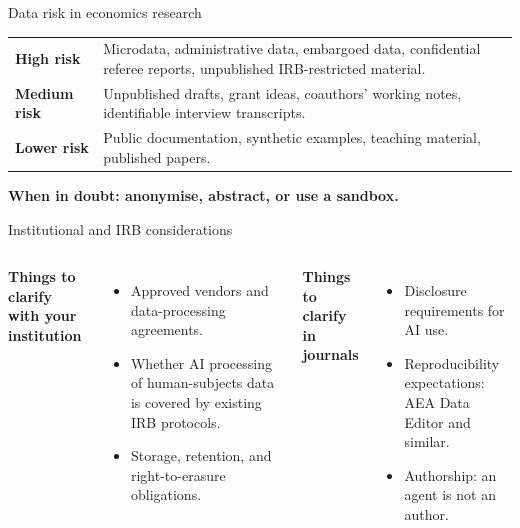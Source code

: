 \begin{frame}{Data risk in economics research}
  \vspace{0.2cm}
  \begin{center}
  \begin{tabularx}{0.92\linewidth}{>{\bfseries\color{deepblue}}lX}
  \toprule
  High risk & Microdata, administrative data, embargoed data, confidential referee reports, unpublished IRB-restricted material.\\
  Medium risk & Unpublished drafts, grant ideas, coauthors' working notes, identifiable interview transcripts.\\
  Lower risk & Public documentation, synthetic examples, teaching material, published papers.\\
  \bottomrule
  \end{tabularx}
  \end{center}
  \vspace{0.4cm}
  \begin{center}\Large\color{accent}\bfseries When in doubt: anonymise, abstract, or use a sandbox.\end{center}
  
\end{frame}

\begin{frame}{Institutional and IRB considerations}
  \begin{columns}[T,onlytextwidth]
      \textbf{Things to clarify with your institution}
      \begin{itemize}\setlength\itemsep{0.3em}
        \item Approved vendors and data-processing agreements.
        \item Whether AI processing of human-subjects data is covered by existing IRB protocols.
        \item Storage, retention, and right-to-erasure obligations.
      \end{itemize}
      \textbf{Things to clarify in journals}
      \begin{itemize}\setlength\itemsep{0.3em}
        \item Disclosure requirements for AI use.
        \item Reproducibility expectations: AEA Data Editor and similar.
        \item Authorship: an agent is not an author.
      \end{itemize}
  \end{columns}
  \vspace{0.5cm}
\end{frame}

